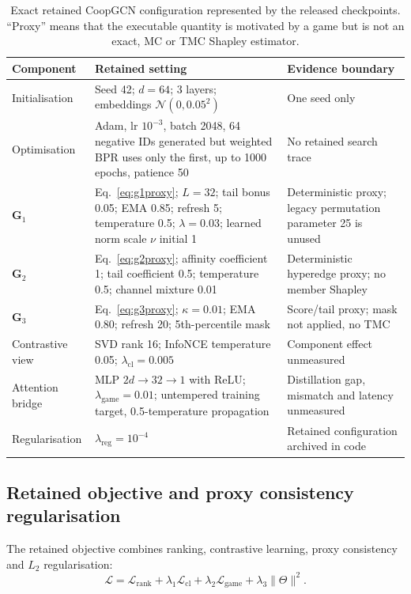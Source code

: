 \documentclass[a4paper,fleqn,longmktitle]{cas-dc}
\begin{document}
\begin{table}[t]
\centering
\caption{Exact retained CoopGCN configuration represented by the released
checkpoints. ``Proxy'' means that the executable quantity is motivated by a
game but is not an exact, MC or TMC Shapley estimator.}
\label{tab:retained-config}
\footnotesize
\begin{tabular}{p{2.6cm}p{5.6cm}p{7.0cm}}
\toprule
\textbf{Component} & \textbf{Retained setting} & \textbf{Evidence boundary}\\
\midrule
Initialisation & Seed 42; $d=64$; 3 layers; embeddings
$\mathcal N(0,0.05^2)$ & One seed only\\
Optimisation & Adam, lr $10^{-3}$, batch 2048, 64 negative IDs generated but
weighted BPR uses only the first, up to 1000 epochs, patience 50 & No retained
search trace\\
$\mathbf G_1$ & Eq.~\eqref{eq:g1proxy}; $L=32$; tail bonus 0.05; EMA 0.85;
refresh 5; temperature 0.5; $\lambda=0.03$; learned norm scale $\nu$ initial 1
& Deterministic proxy; legacy
permutation parameter 25 is unused\\
$\mathbf G_2$ & Eq.~\eqref{eq:g2proxy}; affinity coefficient 1; tail
coefficient 0.5; temperature 0.5; channel mixture 0.01 & Deterministic
hyperedge proxy; no member Shapley\\
$\mathbf G_3$ & Eq.~\eqref{eq:g3proxy}; $\kappa=0.01$; EMA 0.80; refresh 20;
5th-percentile mask & Score/tail proxy; mask not applied, no TMC\\
Contrastive view & SVD rank 16; InfoNCE temperature 0.05;
$\lambda_{\mathrm{cl}}=0.005$ & Component effect unmeasured\\
Attention bridge & MLP $2d\rightarrow32\rightarrow1$ with ReLU;
$\lambda_{\mathrm{game}}=0.01$; untempered training target, 0.5-temperature
propagation & Distillation gap, mismatch and latency unmeasured\\
Regularisation & $\lambda_{\mathrm{reg}}=10^{-4}$ & Retained configuration
archived in code\\
\bottomrule
\end{tabular}
\end{table}

\subsection{Retained objective and proxy consistency regularisation}
\label{sec:loss}

The retained objective combines ranking, contrastive learning, proxy
consistency and $L_2$ regularisation:
\begin{equation}
\mathcal{L} = \mathcal{L}_{\mathrm{rank}}
+ \lambda_1 \mathcal{L}_{\mathrm{cl}}
+ \lambda_2 \mathcal{L}_{\mathrm{game}}
+ \lambda_3 \lVert \Theta \rVert^2 .
\label{eq:total}
\end{equation}
\end{document}
